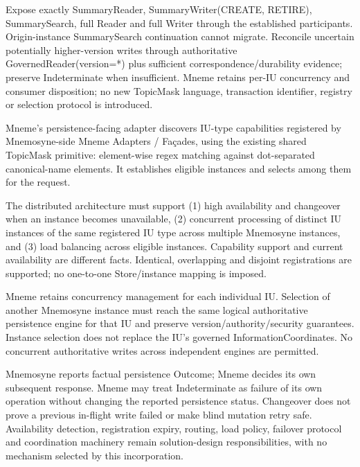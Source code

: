 Expose exactly SummaryReader, SummaryWriter(CREATE, RETIRE), SummarySearch, full Reader and full Writer through the established participants. Origin-instance SummarySearch continuation cannot migrate. Reconcile uncertain potentially higher-version writes through authoritative GovernedReader(version=*) plus sufficient correspondence/durability evidence; preserve Indeterminate when insufficient. Mneme retains per-IU concurrency and consumer disposition; no new TopicMask language, transaction identifier, registry or selection protocol is introduced.



Mneme's persistence-facing adapter discovers IU-type capabilities registered by Mnemosyne-side Mneme Adapters / Façades, using the existing shared TopicMask primitive: element-wise regex matching against dot-separated canonical-name elements. It establishes eligible instances and selects among them for the request.



The distributed architecture must support (1) high availability and changeover when an instance becomes unavailable, (2) concurrent processing of distinct IU instances of the same registered IU type across multiple Mnemosyne instances, and (3) load balancing across eligible instances. Capability support and current availability are different facts. Identical, overlapping and disjoint registrations are supported; no one-to-one Store/instance mapping is imposed.



Mneme retains concurrency management for each individual IU. Selection of another Mnemosyne instance must reach the same logical authoritative persistence engine for that IU and preserve version/authority/security guarantees. Instance selection does not replace the IU's governed InformationCoordinates. No concurrent authoritative writes across independent engines are permitted.



Mnemosyne reports factual persistence Outcome; Mneme decides its own subsequent response. Mneme may treat Indeterminate as failure of its own operation without changing the reported persistence status. Changeover does not prove a previous in-flight write failed or make blind mutation retry safe. Availability detection, registration expiry, routing, load policy, failover protocol and coordination machinery remain solution-design responsibilities, with no mechanism selected by this incorporation.



